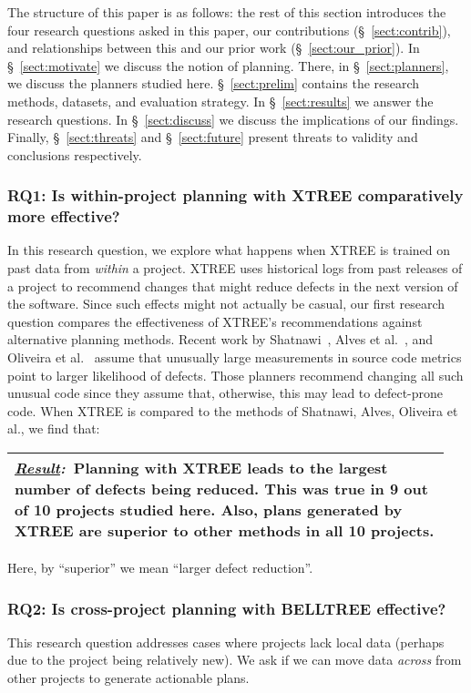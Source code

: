\documentclass[10pt, journal, compsoc]{IEEEtran}
\newcommand{\result}[1]{
\vspace{0.2cm}
\noindent\begin{minipage}{\linewidth}
\begin{tabular}{|p{0.95\linewidth}|}
\hline\vspace{-0.2cm}
\textbf{\textit{\underline{Result}:}}~#1\\\hline
\end{tabular}
\end{minipage}\bigstrut
}
\newcommand{\tion}[1]{\S~\ref{sect:#1}}
\begin{document}
The structure of this paper is as follows: the rest of this section introduces the four research questions asked in this paper, our contributions (\tion{contrib}), and relationships between this and our prior work (\tion{our_prior}). In \tion{motivate} we discuss the notion of planning. There, in \tion{planners}, we discuss the planners studied here. \tion{prelim} contains the research methods, datasets, and evaluation strategy. In \tion{results} we answer the research questions. In \tion{discuss} we discuss the implications of our findings. Finally, \tion{threats} and \tion{future} present threats to validity and conclusions respectively.

\subsubsection*{RQ1: Is within-project planning with XTREE comparatively more effective?}

In this research question, we explore what happens when XTREE  is trained on past data from \textit{within} a project. XTREE uses
historical logs from past releases of a project to recommend changes that might reduce defects in the next version of the software. Since such effects might not actually be casual, 
our first research question compares 
the effectiveness of XTREE's recommendations against  alternative planning methods. Recent work by Shatnawi~\cite{shatnawi}, Alves et al.~\cite{alves}, and Oliveira et al.~\cite{oliveira} assume that unusually large measurements in source code metrics point to larger likelihood of defects. Those
planners recommend changing all such unusual code since they assume that, otherwise, this may lead to defect-prone code. When XTREE is compared to the methods
of Shatnawi, Alves, Oliveira et al., we find that: 

\result{Planning with XTREE leads to the largest number of defects being reduced. This was true in 9 out of 10 projects studied here. Also, plans generated by XTREE are superior to other methods in all 10 projects.}

\vspace{2mm}
\noindent Here, by ``superior'' we mean ``larger defect reduction''.

\subsubsection*{RQ2: Is cross-project planning with BELLTREE effective?}
  
This research question addresses cases where projects lack local data (perhaps due to the project being relatively new). We ask if we can move data {\em across}
from other projects to generate actionable plans.
\end{document}
